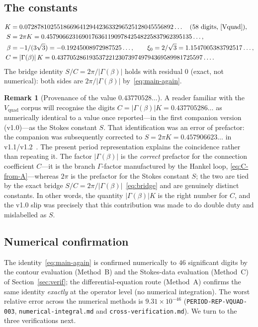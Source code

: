 \documentclass[11pt,reqno]{amsart}
\theoremstyle{plain}
\theoremstyle{definition}
\newtheorem{remark}[theorem]{Remark}
\newcommand{\Vquad}{V_{\mathrm{quad}}}
\newcommand{\xizero}{\xi_0}
\providecommand{\C}{}\renewcommand{\C}{C}
\begin{document}
\subsection{The constants}
\begin{equation}\label{eq:constants}
\begin{aligned}
  K&=0.0728781025518669641294423633296525128045556892\ldots\quad(\text{58 digits, \cite{Vquad}}),\\
  S&=2\pi K=0.457906623169017636119097842548225837962395135\ldots,\\
  \beta&=-1/(3\sqrt3)=-0.19245008972987525\ldots,\qquad \xizero=2/\sqrt3=1.1547005383792517\ldots,\\
  \C&=\lvert\Gamma(\beta)\rvert\,K=0.437705286193537221230739749794369589981725597\ldots .
\end{aligned}
\end{equation}
The bridge identity $S/\C=2\pi/\lvert\Gamma(\beta)\rvert$ holds with residual $0$ (exact, not
numerical): both sides are $2\pi/\lvert\Gamma(\beta)\rvert$ by~\eqref{eq:main-again}.

\begin{remark}[Provenance of the value $0.43770528\ldots$]\label{rmk:provenance-C}
A reader familiar with the $\Vquad$ corpus will recognise the digits
$\C=\lvert\Gamma(\beta)\rvert K=0.437705286\ldots$ as numerically identical to a value once
reported---in the first companion version (v1.0)---as the Stokes constant $S$. That identification
was an error of prefactor: the companion was subsequently corrected to $S=2\pi K=0.457906623\ldots$
in v1.1/v1.2~\cite{StokesNote}. The present period representation explains the coincidence rather
than repeating it. The factor $\lvert\Gamma(\beta)\rvert$ is the \emph{correct} prefactor for the
connection coefficient $\C$---it is the branch $\Gamma$-factor manufactured by the Hankel loop,
\eqref{eq:C-from-A}---whereas $2\pi$ is the prefactor for the Stokes constant $S$; the two are tied
by the exact bridge $S/\C=2\pi/\lvert\Gamma(\beta)\rvert$~\eqref{eq:bridge} and are genuinely
distinct constants. In other words, the quantity $\lvert\Gamma(\beta)\rvert K$ is the right number
for $\C$, and the v1.0 slip was precisely that this contribution was made to do double duty and
mislabelled as $S$.
\end{remark}

\subsection{Numerical confirmation}
The identity~\eqref{eq:main-again} is confirmed numerically to $46$ significant digits by the
contour evaluation (Method~B) and the Stokes-data evaluation (Method~C) of
Section~\ref{sec:verif}; the differential-equation route (Method~A) confirms the same identity
\emph{exactly} at the operator level (no numerical integration). The worst relative error across
the numerical methods is $9.31\times10^{-46}$
(\texttt{PERIOD-REP-VQUAD-003}, \texttt{numerical-integral.md} and
\texttt{cross-verification.md}). We turn to the three verifications next.
\end{document}
